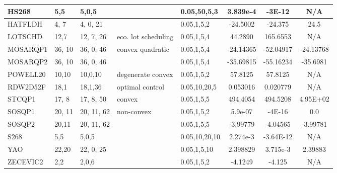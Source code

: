 \begin{landscape}
\begin{longtable}{l | l |  l  |  >{\footnotesize}p{3.5cm} | l | c | c | c  }
HS268  & 5,5  & 5,0,5  & & 0.05,50,5,3     & 3.839e-4 & -3E-12  & N/A   \\ \hline
HATFLDH  & 4, 7 &  4, 0, 21  & & 0.05,1,5,2  &  -24.5002  & -24.375 & 24.5   \\ \hline
LOTSCHD  & 12,7  &  12, 7, 26 & eco. lot scheduling &  0.05,1,5,4   & 44.2890 & 165.6553  & N/A  \\ \hline
MOSARQP1 & 36, 10 & 36, 0, 46 &convex quadratic & 0.05,1,5,4     &  -24.14365 & -52.04917 & -24.13768 \\ \hline
MOSARQP2 &36, 10 & 36, 0, 46 &     & 0.05,1,5,4   & -35.69815  & -55.16234  & -35.6981 \\ \hline
POWELL20 & 10,10  & 10,0,10 & degenerate convex & 0.05,1,5,2    & 57.8125 & 57.8125  & N/A  \\\hline
RDW2D52F & 18,1  & 18,1,36 & optimal control &  0.05,10,20,5 &  0.053016 & 0.020779 & N/A \\\hline
STCQP1  & 17, 8  &  17, 8, 50 & convex   &    0.05,1,5,5  & 494.4054  & 494.5208  & 4.95E+02 \\\hline
SOSQP1 &  20, 11 & 20, 11, 62 & non-convex & 0.05,1,5,2    & 5.9e-07 & -4E-16   & 0.0 \\\hline
SOSQP2 & 20,11  &  20, 11, 62 &    & 0.05,1,5,5	& -3.99779  & -4.04565  & -3.99781    \\\hline
S268   &   5,5   & 5,0,5  &   & 0.05,10,20,10  &   2.274e-3  &  -3.64E-12  & N/A  \\\hline
YAO   &  22,20  & 22, 0, 25 &   &  0.05,1,5,10 & 2.398829  & 3.715e-3 & 2.39883  \\\hline
ZECEVIC2 & 2,2 & 2,0,6  & &  0.05,1,5,2 & -4.1249  & -4.125  & N/A  \\\hline
\end{longtable}   %
\end{landscape}


